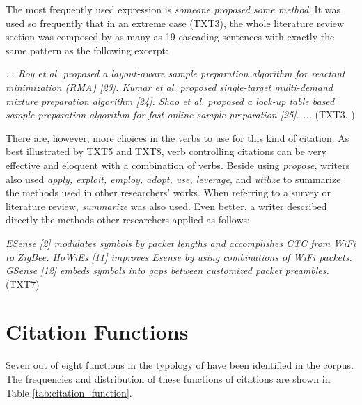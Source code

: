 The most frequently used expression is \textit{someone proposed some method}. It was used so frequently that in an extreme case (TXT3), the whole literature review section was composed by as many as 19 cascading sentences with exactly the same pattern as the following excerpt:

\textit{... Roy et al. proposed a layout-aware sample preparation algorithm for reactant minimization (RMA) [23]. Kumar et al. proposed single-target multi-demand mixture preparation algorithm [24]. Shao et al. proposed a look-up table based sample preparation algorithm for fast online sample preparation [25]. ...} (TXT3, \citealp{ji_more_2018})

There are, however, more choices in the verbs to use for this kind of citation. As best illustrated by TXT5 and TXT8, verb controlling citations can be very effective and eloquent with a combination of verbs. Beside using \textit{propose}, writers also used \textit{apply, exploit, employ, adopt, use, leverage}, and \textit{utilize} to summarize the methods used in other researchers’ works. When referring to a survey or literature review, \textit{summarize} was also used. Even better, a writer described directly the methods other researchers applied as follows:

\textit{ESense [2] modulates symbols by packet lengths and accomplishes CTC from WiFi to ZigBee. HoWiEs [11] improves Esense by using combinations of WiFi packets. GSense [12] embeds symbols into gaps between customized packet preambles.} (TXT7)

\section{Citation Functions}
\label{sec:functions}

Seven out of eight functions in the typology of \citet{petric_rhetorical_2007} have been identified in the corpus. The frequencies and distribution of these functions of citations are shown in Table \ref{tab:citation_function}.

